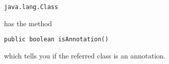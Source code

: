 \documentclass[a4paper, 10pt, titlepage]{scrartcl} %
\begin{document}
\begin{scriptsize}\verb|java|\hspace{0.0pt}\verb|.|\hspace{0.0pt}\verb|lang|\hspace{0.0pt}\verb|.|\hspace{0.0pt}\verb|Class|\end{scriptsize} has the method \begin{scriptsize}\verb|public|\hspace{0.0pt}\verb| |\hspace{0.0pt}\verb|boolean|\hspace{0.0pt}\verb| |\hspace{0.0pt}\verb|isAnnotation|\hspace{0.0pt}\verb|(|\hspace{0.0pt}\verb||\hspace{0.0pt}\verb|)|\hspace{0.0pt}\verb||\end{scriptsize} which
tells you if the referred class is an annotation.
\end{document}
